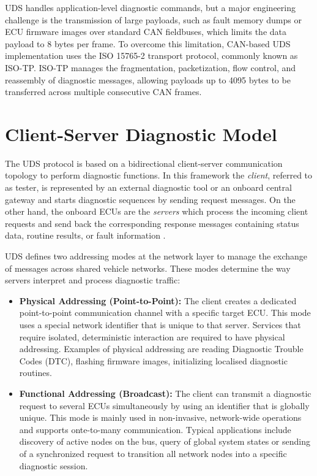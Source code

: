 \gls{UDS} handles application-level diagnostic commands, but a major engineering challenge is the transmission of large payloads, such as fault memory dumps or ECU firmware images over standard \gls{CAN} fieldbuses, which limits the data payload to 8 bytes per frame. To overcome this limitation, \gls{CAN}-based \gls{UDS} implementation uses the ISO 15765-2 transport protocol, commonly known as ISO-TP\cite{medium_uds_isotp_relationship}. ISO-TP manages the fragmentation, packetization, flow control, and reassembly of diagnostic messages, allowing payloads up to 4095 bytes to be transferred across multiple consecutive \gls{CAN} frames.
\section{Client-Server Diagnostic Model}\label{sec:client_server_model}
The \gls{UDS} protocol is based on a bidirectional client-server communication topology to perform diagnostic functions. In this framework the \textit{client}, referred to as tester, is represented by an external diagnostic tool or an onboard central gateway and starts diagnostic sequences by sending request messages. On the other hand, the onboard \glspl{ECU} are the \textit{servers} which process the incoming client requests and send back the corresponding response messages containing status data, routine results, or fault information \cite{csselectronics_uds_protocol}.

\gls{UDS} defines two addressing modes at the network layer to manage the exchange of messages across shared vehicle networks. These modes determine the way servers interpret and process diagnostic traffic\cite{vector_elearning_2021}:

\begin{itemize}
    \item \textbf{Physical Addressing (Point-to-Point):} The client creates a dedicated point-to-point communication channel with a specific target \gls{ECU}. This mode uses a special network identifier that is unique to that server. Services that require isolated, deterministic interaction are required to have physical addressing. Examples of physical addressing are reading Diagnostic Trouble Codes (\gls{DTC}), flashing firmware images, initializing localised diagnostic routines.
    \item \textbf{Functional Addressing (Broadcast):} The client can transmit a diagnostic request to several \glspl{ECU} simultaneously by using an identifier that is globally unique. This mode is mainly used in non-invasive, network-wide operations and supports onte-to-many communication. Typical applications include discovery of active nodes on the bus, query of global system states or sending of a synchronized request to transition all network nodes into a specific diagnostic session.
\end{itemize}

